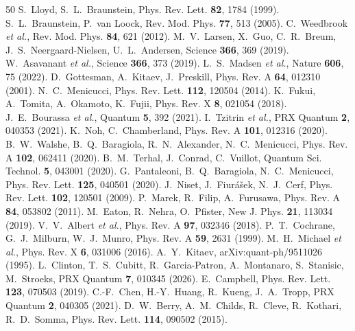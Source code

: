 \documentclass[aps,pra,reprint,superscriptaddress,nofootinbib]{revtex4-2}
\begin{document}
\begin{thebibliography}{50}
 S.~Lloyd, S.~L.~Braunstein, Phys. Rev. Lett.
\textbf{82}, 1784 (1999).
 S.~L.~Braunstein, P.~van Loock, Rev. Mod. Phys.
\textbf{77}, 513 (2005).
 C.~Weedbrook \emph{et al.}, Rev. Mod. Phys.
\textbf{84}, 621 (2012).
 M.~V.~Larsen, X.~Guo, C.~R.~Breum,
J.~S.~Neergaard-Nielsen, U.~L.~Andersen, Science \textbf{366}, 369 (2019).
 W.~Asavanant \emph{et al.}, Science \textbf{366},
373 (2019).
 L.~S.~Madsen \emph{et al.}, Nature \textbf{606}, 75
(2022).
 D.~Gottesman, A.~Kitaev, J.~Preskill, Phys. Rev. A
\textbf{64}, 012310 (2001).
 N.~C.~Menicucci, Phys. Rev. Lett. \textbf{112},
120504 (2014).
 K.~Fukui, A.~Tomita, A.~Okamoto, K.~Fujii, Phys. Rev. X
\textbf{8}, 021054 (2018).
 J.~E.~Bourassa \emph{et al.}, Quantum \textbf{5}, 392
(2021).
 I.~Tzitrin \emph{et al.}, PRX Quantum \textbf{2},
040353 (2021).
 K.~Noh, C.~Chamberland, Phys. Rev. A \textbf{101}, 012316
(2020).
 B.~W.~Walshe, B.~Q.~Baragiola, R.~N.~Alexander,
N.~C.~Menicucci, Phys. Rev. A \textbf{102}, 062411 (2020).
 B.~M.~Terhal, J.~Conrad, C.~Vuillot, Quantum Sci.
Technol. \textbf{5}, 043001 (2020).
 G.~Pantaleoni, B.~Q.~Baragiola, N.~C.~Menicucci,
Phys. Rev. Lett. \textbf{125}, 040501 (2020).
 J.~Niset, J.~Fiur\'a\v{s}ek, N.~J.~Cerf, Phys. Rev. Lett.
\textbf{102}, 120501 (2009).
 P.~Marek, R.~Filip, A.~Furusawa, Phys. Rev. A
\textbf{84}, 053802 (2011).
 M.~Eaton, R.~Nehra, O.~Pfister, New J. Phys.
\textbf{21}, 113034 (2019).
 V.~V.~Albert \emph{et al.}, Phys. Rev. A \textbf{97},
032346 (2018).
 P.~T.~Cochrane, G.~J.~Milburn, W.~J.~Munro, Phys.
Rev. A \textbf{59}, 2631 (1999).
 M.~H.~Michael \emph{et al.}, Phys. Rev. X \textbf{6},
031006 (2016).
 A.~Y.~Kitaev, arXiv:quant-ph/9511026 (1995).
 L.~Clinton, T.~S.~Cubitt, R.~Garcia-Patron,
A.~Montanaro, S.~Stanisic, M.~Stroeks, PRX Quantum \textbf{7}, 010345 (2026).
 E.~Campbell, Phys. Rev. Lett. \textbf{123}, 070503
(2019).
 C.-F.~Chen, H.-Y.~Huang, R.~Kueng, J.~A.~Tropp, PRX
Quantum \textbf{2}, 040305 (2021).
 D.~W.~Berry, A.~M.~Childs, R.~Cleve, R.~Kothari,
R.~D.~Somma, Phys. Rev. Lett. \textbf{114}, 090502 (2015).

\end{thebibliography}
\end{document}
